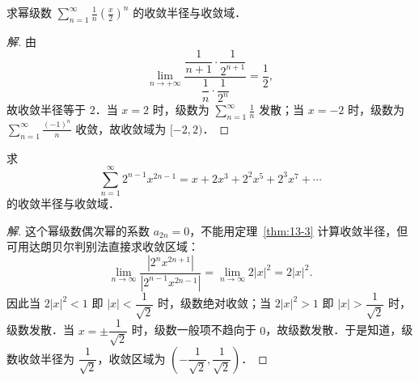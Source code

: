 \begin{example}\label{ex:13-1-2}
求幂级数 $\displaystyle\sum_{n=1}^{\infty}\frac{1}{n}\left(\frac{x}{2}\right)^{n}$ 的收敛半径与收敛域．
\end{example}

\begin{proof}[解]
由
\[
\lim_{n\to+\infty}\frac{\dfrac{1}{n+1}\cdot\dfrac{1}{2^{n+1}}}{\dfrac{1}{n}\cdot\dfrac{1}{2^{n}}}=\frac{1}{2},
\]
故收敛半径等于 $2$．当 $x=2$ 时，级数为 $\displaystyle\sum_{n=1}^{\infty}\frac{1}{n}$ 发散；当 $x=-2$ 时，级数为 $\displaystyle\sum_{n=1}^{\infty}\frac{(-1)^{n}}{n}$ 收敛，故收敛域为 $[-2,2)$．
\end{proof}

\begin{example}\label{ex:13-1-3}
求
\[
\sum_{n=1}^{\infty}2^{n-1}x^{2n-1}=x+2x^{3}+2^{2}x^{5}+2^{3}x^{7}+\cdots
\]
的收敛半径与收敛域．
\end{example}

\begin{proof}[解]
这个幂级数偶次幂的系数 $a_{2n}=0$，不能用定理~\ref{thm:13-3} 计算收敛半径，但可用达朗贝尔判别法直接求收敛区域：
\[
\lim_{n\to\infty}\frac{\left|2^{n}x^{2n+1}\right|}{\left|2^{n-1}x^{2n-1}\right|}=\lim_{n\to\infty}2\left|x\right|^{2}=2\left|x\right|^{2}.
\]
因此当 $2\left|x\right|^{2}<1$ 即 $\left|x\right|<\dfrac{1}{\sqrt{2}}$ 时，级数绝对收敛；当 $2\left|x\right|^{2}>1$ 即 $\left|x\right|>\dfrac{1}{\sqrt{2}}$ 时，级数发散．当 $x=\pm\dfrac{1}{\sqrt{2}}$ 时，级数一般项不趋向于 $0$，故级数发散．于是知道，级数收敛半径为 $\dfrac{1}{\sqrt{2}}$，收敛区域为 $\left(-\dfrac{1}{\sqrt{2}},\dfrac{1}{\sqrt{2}}\right)$．
\end{proof}

